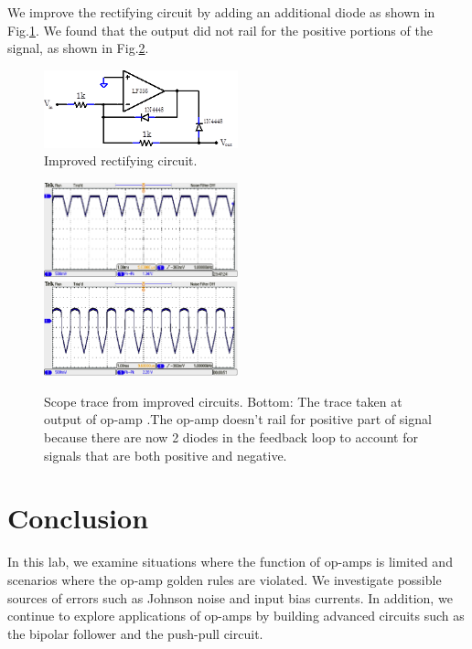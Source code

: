 \documentclass[authoryear, 12pt,5p, times]{elsarticle}
\begin{document}
 \par We improve the rectifying circuit by adding an additional diode as shown in Fig.\ref{8_20_schema2}. We found that the output did not rail for the positive portions of the signal, as shown in Fig.\ref{better}.
 \begin{figure}[h!]
 \centering
  \includegraphics[width=0.5\textwidth]{figure/8_20_schema_2.png} 
\caption{Improved rectifying circuit.}
\label{8_20_schema2}
 \end{figure}
 \begin{figure}[h!]
 \centering
  \includegraphics[width=0.5\textwidth]{figure/better.png} 
    \includegraphics[width=0.5\textwidth]{figure/better2.png} 
\caption{Scope trace from improved circuits. Bottom: The trace taken at output of op-amp .The op-amp doesn’t rail for positive part of signal because there are now 2 diodes in the feedback loop to account for signals that are both positive and negative. }
\label{better}
 \end{figure}
\section*{Conclusion}
In this lab, we examine situations where the function of op-amps is limited and scenarios where the op-amp golden rules are violated. We investigate possible sources of errors such as Johnson noise and input bias currents. In addition, we continue to explore applications of op-amps by building advanced circuits such as the bipolar follower and the push-pull circuit.
\end{document}
